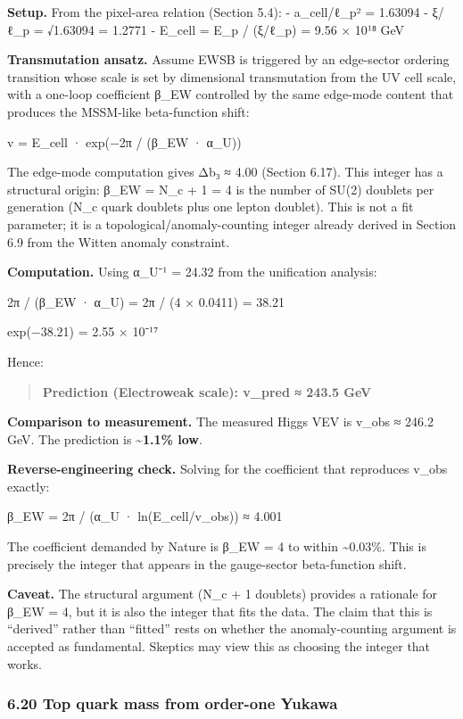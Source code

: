 \documentclass[11pt,a4paper]{article}
\theoremstyle{remark}
\begin{document}
\textbf{Setup.} From the pixel-area relation (Section 5.4):
- a\_cell/ℓ\_p² = 1.63094
- ξ/ℓ\_p = √1.63094 = 1.2771
- E\_cell = E\_p / (ξ/ℓ\_p) = 9.56 × 10¹⁸ GeV

\textbf{Transmutation ansatz.} Assume EWSB is triggered by an edge-sector ordering transition whose scale is set by dimensional transmutation from the UV cell scale, with a one-loop coefficient β\_EW controlled by the same edge-mode content that produces the MSSM-like beta-function shift:

v = E\_cell · exp(−2π / (β\_EW · α\_U))

The edge-mode computation gives Δb₃ ≈ 4.00 (Section 6.17). This integer has a structural origin: β\_EW = N\_c + 1 = 4 is the number of SU(2) doublets per generation (N\_c quark doublets plus one lepton doublet). This is not a fit parameter; it is a topological/anomaly-counting integer already derived in Section 6.9 from the Witten anomaly constraint.

\textbf{Computation.} Using α\_U⁻¹ = 24.32 from the unification analysis:

2π / (β\_EW · α\_U) = 2π / (4 × 0.0411) = 38.21

exp(−38.21) = 2.55 × 10⁻¹⁷

Hence:

\begin{quote}
\textbf{Prediction (Electroweak scale): v\_pred ≈ 243.5 GeV}
\end{quote}

\textbf{Comparison to measurement.} The measured Higgs VEV is v\_obs ≈ 246.2 GeV.
The prediction is \textbf{\textasciitilde1.1\% low}.

\textbf{Reverse-engineering check.} Solving for the coefficient that reproduces v\_obs exactly:

β\_EW = 2π / (α\_U · ln(E\_cell/v\_obs)) ≈ 4.001

The coefficient demanded by Nature is β\_EW = 4 to within \textasciitilde0.03\%. This is precisely the integer that appears in the gauge-sector beta-function shift.

\textbf{Caveat.} The structural argument (N\_c + 1 doublets) provides a rationale for β\_EW = 4, but it is also the integer that fits the data. The claim that this is ``derived'' rather than ``fitted'' rests on whether the anomaly-counting argument is accepted as fundamental. Skeptics may view this as choosing the integer that works.

\subsubsection{6.20 Top quark mass from order-one Yukawa}\label{top-quark-mass-from-order-one-yukawa}
\end{document}
